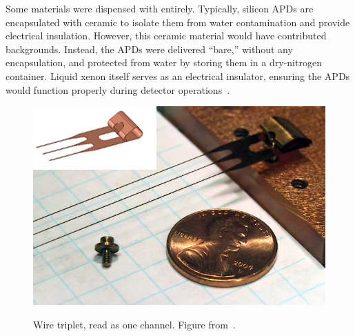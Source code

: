 Some materials were dispensed with entirely.  Typically, silicon APDs are encapsulated with ceramic to isolate them from water contamination and provide electrical insulation.  However, this ceramic material would have contributed backgrounds.  Instead, the APDs were delivered ``bare,'' without any encapsulation, and protected from water by storing them in a dry-nitrogen container.  Liquid xenon itself serves as an electrical insulator, ensuring the APDs would function properly during detector operations~\cite{EXOLAAPD}.

\begin{figure}
\begin{center}
\includegraphics[keepaspectratio=true,width=\textwidth]{triplet.jpg}
\end{center}
\renewcommand{\baselinestretch}{1}
\small\normalsize
\begin{quote}
\caption{Wire triplet, read as one channel.  Figure from~\cite{detectorPartI}.}
\label{fig:WireTriplet}
\end{quote}
\end{figure}
\renewcommand{\baselinestretch}{2}
\small\normalsize

